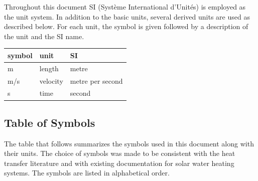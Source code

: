\documentclass[12pt]{article}
\begin{document}
Throughout this document SI (Syst\`{e}me International d'Unit\'{e}s) is employed
as the unit system.  In addition to the basic units, several derived units are
used as described below.  For each unit, the symbol is given followed by a
description of the unit and the SI name.
~\newline

\renewcommand{\arraystretch}{1.2}
  \noindent \begin{tabular}{l l l} 
    \toprule		
    \textbf{symbol} & \textbf{unit} & \textbf{SI}\\
    \midrule 
    \si{\metre} & length & metre\\
    \si[per-mode=symbol]{\metre\per\second} & velocity	& metre per second\\
    \si{\second} & time & second\\
    \bottomrule
  \end{tabular}




\subsection{Table of Symbols}

The table that follows summarizes the symbols used in this document along with
their units.  The choice of symbols was made to be consistent with the heat
transfer literature and with existing documentation for solar water heating
systems.  The symbols are listed in alphabetical order.
\end{document}

